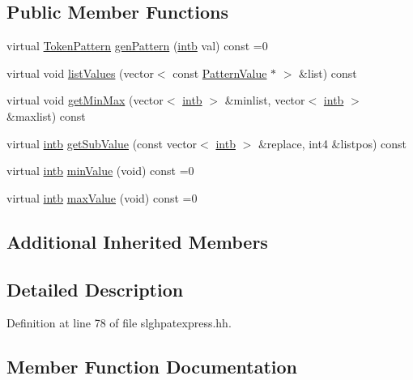 \subsection*{Public Member Functions}
\begin{DoxyCompactItemize}
\item 
virtual \mbox{\hyperlink{class_token_pattern}{Token\+Pattern}} \mbox{\hyperlink{class_pattern_value_acc5a0c3b740a93e6ed5d3882c960ef98}{gen\+Pattern}} (\mbox{\hyperlink{types_8h_aa925ba3e627c2df89d5b1cfe84fb8572}{intb}} val) const =0
\item 
virtual void \mbox{\hyperlink{class_pattern_value_abb0724c0454f8ed78f9082cde5a8077d}{list\+Values}} (vector$<$ const \mbox{\hyperlink{class_pattern_value}{Pattern\+Value}} $\ast$ $>$ \&list) const
\item 
virtual void \mbox{\hyperlink{class_pattern_value_add81554f00ea23c27314f7699ef2b5f3}{get\+Min\+Max}} (vector$<$ \mbox{\hyperlink{types_8h_aa925ba3e627c2df89d5b1cfe84fb8572}{intb}} $>$ \&minlist, vector$<$ \mbox{\hyperlink{types_8h_aa925ba3e627c2df89d5b1cfe84fb8572}{intb}} $>$ \&maxlist) const
\item 
virtual \mbox{\hyperlink{types_8h_aa925ba3e627c2df89d5b1cfe84fb8572}{intb}} \mbox{\hyperlink{class_pattern_value_a2c441de78d7241fc841c4223efe1b8bc}{get\+Sub\+Value}} (const vector$<$ \mbox{\hyperlink{types_8h_aa925ba3e627c2df89d5b1cfe84fb8572}{intb}} $>$ \&replace, int4 \&listpos) const
\item 
virtual \mbox{\hyperlink{types_8h_aa925ba3e627c2df89d5b1cfe84fb8572}{intb}} \mbox{\hyperlink{class_pattern_value_a0dbf85240fe6310e36596fea3bb02f2e}{min\+Value}} (void) const =0
\item 
virtual \mbox{\hyperlink{types_8h_aa925ba3e627c2df89d5b1cfe84fb8572}{intb}} \mbox{\hyperlink{class_pattern_value_a865e8f34e031ef31f77dcaa93d76820d}{max\+Value}} (void) const =0
\end{DoxyCompactItemize}
\subsection*{Additional Inherited Members}


\subsection{Detailed Description}


Definition at line 78 of file slghpatexpress.\+hh.



\subsection{Member Function Documentation}
\mbox{\label{class_pattern_value_acc5a0c3b740a93e6ed5d3882c960ef98}} 
